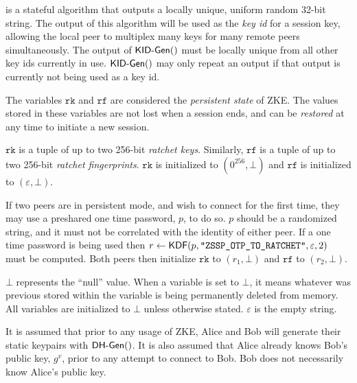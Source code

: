 \documentclass{article}
\begin{document}
\begin{definition}
	 is a stateful algorithm that outputs a locally unique, uniform random 32-bit string. The output of this algorithm will be used as the \emph{key id} for a session key, allowing the local peer to multiplex many keys for many remote peers simultaneously. The output of $\text{\sf KID-Gen}()$ must be locally unique from all other key ids currently in use. $\text{\sf KID-Gen}()$ may only repeat an output if that output is currently not being used as a key id.
\end{definition}


\begin{definition}
	The variables $\texttt{rk}$ and $\texttt{rf}$ are considered the \emph{persistent state} of ZKE. The values stored in these variables are not lost when a session ends, and can be \emph{restored} at any time to initiate a new session.

	$\texttt{rk}$ is a tuple of up to two 256-bit \emph{ratchet keys}. Similarly, $\texttt{rf}$ is a tuple of up to two 256-bit \emph{ratchet fingerprints}. $\texttt{rk}$ is initialized to $(0^{256}, \bot)$ and $\texttt{rf}$ is initialized to $(\varepsilon, \bot)$.

	If two peers are in persistent mode, and wish to connect for the first time, they may use a preshared one time password, $p$, to do so. $p$ should be a randomized string, and it must not be correlated with the identity of either peer. If a one time password is being used then $r\gets \text{\sf KDF}(p, \texttt{"ZSSP\_OTP\_TO\_RATCHET"}, \varepsilon, 2)$ must be computed. Both peers then initialize $\texttt{rk}$ to $(r_1, \bot)$ and $\texttt{rf}$ to $(r_2, \bot)$.
\end{definition}

$\bot$ represents the ``null'' value. When a variable is set to $\bot$, it means whatever was previous stored within the variable is being permanently deleted from memory. All variables are initialized to $\bot$ unless otherwise stated. $\varepsilon$ is the empty string.

It is assumed that prior to any usage of ZKE, Alice and Bob will generate their static keypairs with $\text{\sf DH-Gen}()$. It is also assumed that Alice already knows Bob's public key, $g^v$, prior to any attempt to connect to Bob. Bob does not necessarily know Alice's public key.
\end{document}
